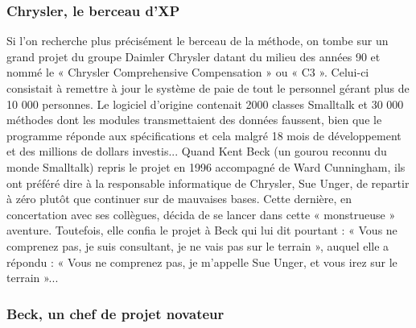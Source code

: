 \documentclass[]{article}
\begin{document}
\hypertarget{chrysler-le-berceau-dxp}{%
\subsubsection{Chrysler, le berceau
d'XP}\label{chrysler-le-berceau-dxp}}

Si l'on recherche plus précisément le berceau de la méthode, on tombe
sur un grand projet du groupe Daimler Chrysler datant du milieu des
années 90 et nommé le « Chrysler Comprehensive Compensation » ou « C3 ».
Celui-ci consistait à remettre à jour le système de paie de tout le
personnel gérant plus de 10 000 personnes. Le logiciel d'origine
contenait 2000 classes Smalltalk et 30 000 méthodes dont les modules
transmettaient des données faussent, bien que le programme réponde aux
spécifications et cela malgré 18 mois de développement et des millions
de dollars investis... Quand Kent Beck (un gourou reconnu du monde
Smalltalk) repris le projet en 1996 accompagné de Ward Cunningham, ils
ont préféré dire à la responsable informatique de Chrysler, Sue Unger,
de repartir à zéro plutôt que continuer sur de mauvaises bases. Cette
dernière, en concertation avec ses collègues, décida de se lancer dans
cette « monstrueuse » aventure. Toutefois, elle confia le projet à Beck
qui lui dit pourtant : « Vous ne comprenez pas, je suis consultant, je
ne vais pas sur le terrain », auquel elle a répondu : « Vous ne
comprenez pas, je m'appelle Sue Unger, et vous irez sur le terrain »...



\hypertarget{beck-un-chef-de-projet-novateur}{%
\subsubsection{Beck, un chef de projet
novateur}\label{beck-un-chef-de-projet-novateur}}
\end{document}
